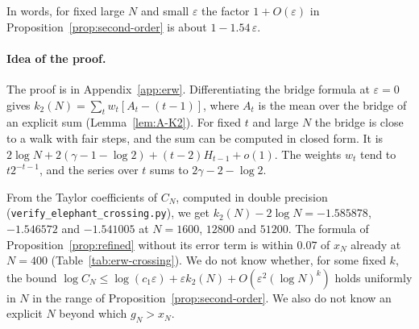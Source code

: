 In words, for fixed large $N$ and small $\varepsilon$ the factor
$1+O(\varepsilon)$ in Proposition~\ref{prop:second-order} is about
$1-1.54\,\varepsilon$.

\paragraph{Idea of the proof.}
The proof is in Appendix~\ref{app:erw}. Differentiating the bridge formula
at $\varepsilon=0$ gives $k_2(N)=\sum_tw_t[A_t-(t-1)]$, where $A_t$ is the
mean over the bridge of an explicit sum (Lemma~\ref{lem:A-K2}). For fixed
$t$ and large $N$ the bridge is close to a walk with fair steps, and the
sum can be computed in closed form. It is
$2\log N+2(\gamma-1-\log2)+(t-2)H_{t-1}+o(1)$. The weights $w_t$ tend to
$t2^{-t-1}$, and the series over $t$ sums to $2\gamma-2-\log2$.

\begin{remark}\label{rem:refined}
From the Taylor coefficients of $C_N$, computed in double precision
(\texttt{verify\_elephant\_crossing.py}), we get
$k_2(N)-2\log N=-1.585878$, $-1.546572$ and $-1.541005$ at $N=1600$, $12800$
and $51200$. The formula of Proposition~\ref{prop:refined} without its error
term is within $0.07$ of $x_N$ already at $N=400$
(Table~\ref{tab:erw-crossing}). We do not know whether, for some fixed $k$,
the bound
$\log C_N\le\log(c_1\varepsilon)+\varepsilon k_2(N)+O(\varepsilon^2(\log N)^k)$
holds uniformly in $N$ in the range of Proposition~\ref{prop:second-order}.
We also do not know an explicit $N$ beyond which $g_N>x_N$.
\end{remark}
